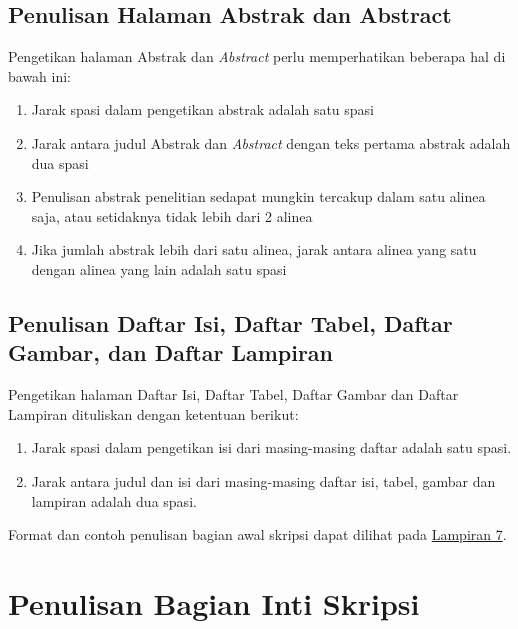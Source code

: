 \documentclass[
  indonesian,
  letterpaper,
]{scrbook}
\providecommand{\tightlist}{%
  \setlength{\itemsep}{0pt}\setlength{\parskip}{0pt}}
\begin{document}
\subsection{Penulisan Halaman Abstrak dan
Abstract}\label{penulisan-halaman-abstrak-dan-abstract}

Pengetikan halaman Abstrak dan \emph{Abstract} perlu memperhatikan
beberapa hal di bawah ini:

\begin{enumerate}
\def\labelenumi{\arabic{enumi}.}
\tightlist
\item
  Jarak spasi dalam pengetikan abstrak adalah satu spasi
\item
  Jarak antara judul Abstrak dan \emph{Abstract} dengan teks pertama
  abstrak adalah dua spasi
\item
  Penulisan abstrak penelitian sedapat mungkin tercakup dalam satu
  alinea saja, atau setidaknya tidak lebih dari 2 alinea
\item
  Jika jumlah abstrak lebih dari satu alinea, jarak antara alinea yang
  satu dengan alinea yang lain adalah satu spasi
\end{enumerate}

\subsection{Penulisan Daftar Isi, Daftar Tabel, Daftar Gambar, dan
Daftar
Lampiran}\label{penulisan-daftar-isi-daftar-tabel-daftar-gambar-dan-daftar-lampiran}

Pengetikan halaman Daftar Isi, Daftar Tabel, Daftar Gambar dan Daftar
Lampiran dituliskan dengan ketentuan berikut:

\begin{enumerate}
\def\labelenumi{\arabic{enumi}.}
\tightlist
\item
  Jarak spasi dalam pengetikan isi dari masing-masing daftar adalah satu
  spasi.
\item
  Jarak antara judul dan isi dari masing-masing daftar isi, tabel,
  gambar dan lampiran adalah dua spasi.
\end{enumerate}

Format dan contoh penulisan bagian awal skripsi dapat dilihat pada
\hyperref[_Lampiran_7_Contoh]{Lampiran 7}.

\section{Penulisan Bagian Inti
Skripsi}\label{penulisan-bagian-inti-skripsi}
\end{document}
